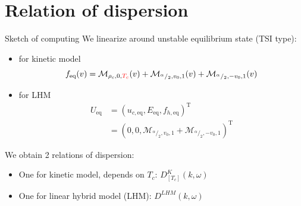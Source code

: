 \documentclass{beamer}
\begin{document}
\section{Relation of dispersion}
\begin{frame}{Sketch of computing}
  We linearize around unstable equilibrium state (TSI type):
  \begin{itemize}
    \item for kinetic model $$f_\text{eq}(v) = \mathcal{M}_{\rho_c,0,{\color{red}T_c}}(v) + \mathcal{M}_{^\alpha/_2,v_0,1}(v) + \mathcal{M}_{^\alpha/_2,-v_0,1}(v)$$
    \item for LHM $$
      \begin{aligned}
        U_\text{eq} &= \left(u_{c,\text{eq}},E_\text{eq},f_{h,\text{eq}}\right)^\text{T} \\
                    &= \left(0,0, \mathcal{M}_{^\alpha/_2,v_0,1} + \mathcal{M}_{^\alpha/_2,-v_0,1}\right)^\text{T}
      \end{aligned}
    $$
  \end{itemize}

  We obtain 2 relations of dispersion:
  \begin{itemize}
    \item One for kinetic model, depends on $T_c$: $D^K_{[T_c]}(k,\omega)$
    \item One for linear hybrid model (LHM): $D^{LHM}(k,\omega)$
  \end{itemize}
\end{frame}
\end{document}
